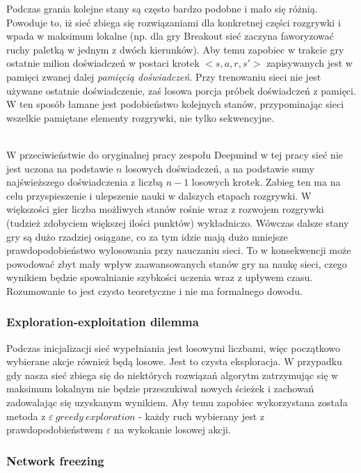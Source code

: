 \documentclass[12pt]{article}
\begin{document}
Podczas grania kolejne stany są często bardzo podobne i mało się różnią. Powoduje to, iż sieć zbiega się rozwiązaniami dla konkretnej części rozgrywki i wpada w maksimum lokalne (np. dla gry Breakout sieć zaczyna faworyzować ruchy paletką w jednym z dwóch kierunków). Aby temu zapobiec w trakcie gry ostatnie milion doświadczeń w postaci krotek $<s, a, r, s'>$ zapisywanych jest w pamięci zwanej dalej \textit{pamięcią doświadczeń}. Przy trenowaniu sieci nie jest używane ostatnie doświadczenie, zaś losowa porcja próbek doświadczeń z pamięci. W ten sposób łamane jest podobieństwo kolejnych stanów, przypominając sieci wszelkie pamiętane elementy rozgrywki, nie tylko sekwencyjne.
\\\

W przeciwieństwie do oryginalnej pracy zespołu Deepmind \cite{deepmind_2} w tej pracy sieć nie jest uczona na podstawie $n$ losowych doświadczeń, a na podstawie sumy najświeższego doświadczenia z liczbą $n-1$ losowych krotek. Zabieg ten ma na celu przyspieszenie i ulepszenie nauki w dalszych etapach rozgrywki. W większości gier liczba możliwych stanów rośnie wraz z rozwojem rozgrywki (tudzież zdobyciem większej ilości punktów) wykładniczo. Wówczas dalsze stany gry są dużo rzadziej osiągane, co za tym idzie mają dużo mniejsze prawdopodobieństwo wylosowania przy nauczaniu sieci. To w konsekwencji może powodować zbyt mały wpływ zaawansowanych stanów gry na naukę sieci, czego wynikiem będzie spowalnianie szybkości uczenia wraz z upływem czasu.
\\
Rozumowanie to jest czysto teoretyczne i nie ma formalnego dowodu.

\subsubsection{Exploration-exploitation dilemma}

Podczas inicjalizacji sieć wypełniania jest losowymi liczbami, więc początkowo wybierane akcje również będą losowe. Jest to czysta eksploracja. W przypadku gdy nasza sieć zbiega się do niektórych rozwiązań algorytm zatrzymując się w maksimum lokalnym nie będzie przeszukiwał nowych ścieżek i zachowań zadowalając się uzyskanym wynikiem. Aby temu zapobiec wykorzystana została metoda z $\varepsilon\ greedy\ exploration$ - każdy ruch wybierany jest z prawdopodobieństwem $\varepsilon$ na wykokanie losowej akcji.

\subsubsection{Network freezing}
\end{document}

